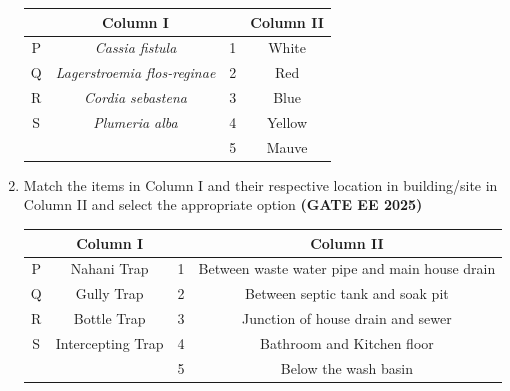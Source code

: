 \documentclass[journal,12pt,onecolumn]{IEEEtran}
\theoremstyle{remark}
\begin{document}
\begin{enumerate}
 \begin{tabular}{|c|c|c|c|} \hline
  & Column I & & Column II \\ \hline
  P&\textit{Cassia fistula}&1&White  \\ \hline
  Q&\textit{Lagerstroemia flos-reginae}&2 &Red\\ \hline
  R&\textit{Cordia sebastena} &3&Blue\\ \hline
  S&\textit{Plumeria alba}&4&Yellow\\ \hline
   &  &5&Mauve\\ \hline
 \end{tabular}
 \begin{enumerate}
 \end{enumerate}
 \item Match the items in Column I and their respective location in building/site in Column II and select the appropriate option \hfill \textbf{(GATE EE 2025)}\\
 \begin{tabular}{|c|c|c|c|} \hline
   & Column I &  & Column II\\ \hline
P&Nahani Trap &1&Between waste water pipe and main house drain\\ \hline
Q &Gully Trap&2&Between septic tank and soak pit\\ \hline
R&Bottle Trap &3&Junction of house drain and sewer\\ \hline
S&Intercepting Trap &4&Bathroom and Kitchen floor\\ \hline
      &  &5 &Below the wash basin\\ \hline 
 \end{tabular}
 \begin{enumerate}
 \end{enumerate}

\end{enumerate}
\end{document}
